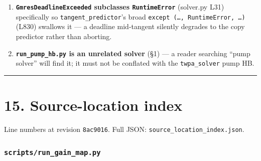 \documentclass[
  10pt,
]{article}
\begin{document}
\begin{enumerate}
  \textbf{\texttt{spectral\_coupled} / \texttt{real\_coupled} on the
  Schur backend} use \texttt{D\_nn} as the linear part (dropping the
  dense Schur correction) --- an intentional approximation
  (\texttt{schur\_operators.py} L16--20 docstring), exact only through
  the matrix-free operator that GMRES corrects against. Not a bug, but
  the preconditioner is \emph{not} the exact reduced Jacobian for these
  two values (only \texttt{real\_coupled\_fast} keeps assembly reuse;
  all keep the conjugate term).
\item
  \textbf{\texttt{GmresDeadlineExceeded} subclasses
  \texttt{RuntimeError}} (solver.py L31) specifically so
  \texttt{tangent\_predictor}'s broad
  \texttt{except\ (…,\ RuntimeError,\ …)} (L830) swallows it --- a
  deadline mid-tangent silently degrades to the copy predictor rather
  than aborting.
\item
  \textbf{\texttt{run\_pump\_hb.py} is an unrelated solver} (§1) --- a
  reader searching ``pump solver'' will find it; it must not be
  conflated with the \texttt{twpa\_solver} pump HB.
\end{enumerate}

\begin{center}\rule{0.5\linewidth}{0.5pt}\end{center}

\section{15. Source-location index}\label{source-location-index}

Line numbers at revision \texttt{8ac9016}. Full JSON:
\texttt{source\_location\_index.json}.

\subsubsection{\texorpdfstring{\texttt{scripts/run\_gain\_map.py}}{scripts/run\_gain\_map.py}}\label{scriptsrun_gain_map.py}
\end{document}
